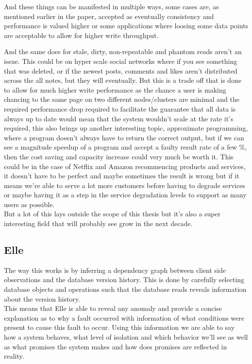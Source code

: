 \documentclass[a4paper,10pt,titlepage]{report}
\begin{document}
And these things can be manifested in multiple ways, some cases are, as mentioned earlier in the paper, accepted as eventually consistency and performance is valued higher or some applications where loosing some data points are acceptable to allow for higher write throughput.\\
\vspace{5mm}

And the same does for stale, dirty, non-repeatable and phantom reads aren't an issue. This could be on hyper scale social networks where if you see something that was deleted, or if the newest posts, comments and likes aren't distributed across the all notes, but they will eventually. But this is a trade off that is done to allow for much higher write performance as the chance a user is making chancing to the same page on two different nodes/clusters are minimal and the required performance drop required to facilitate the guarantee that all data is always up to date would mean that the system wouldn't scale at the rate it's required, this also brings up another interesting topic, approximate programming, where a program doesn't always have to return the correct output, but if we can see a magnitude speedup of a program and accept a faulty result rate of a few \%, then the cost saving and capacity increase could very much be worth it. This could be in the case of Netflix and Amazon recommencing products and services, it doesn't have to be perfect and maybe sometimes the result is wrong but if it means we're able to serve a lot more customers before having to degrade services or maybe having it as a step in the service degradation levels to support as many users as possible. \\
\vspace{5mm}
But a lot of this lays outside the scope of this thesis but it's also a super interesting field that will probably see grow in the next decade.


\subsection{Elle}


The way this works is by inferring a dependency graph between client side observations and the database version history. This is done by carefully selecting database objects and operations such that the database reads reveals information about the version history.\\
\vspace{5mm}
This means that Elle is able to reveal any anomaly and provide a concise explanation as to why a fault occurred with information of what conditions were present to cause this fault to occur. Using this information we are able to say how a system behaves, what level of isolation and which behavior we'll see as well as what promises the system makes and how does promises are reflected in reality.\\
\end{document}
